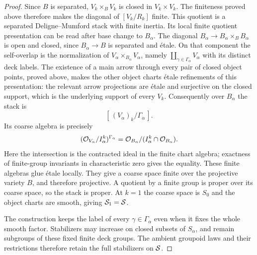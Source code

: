 \begin{proof}
Since $B$ is separated, $V_k\times_BV_k$ is closed in $V_k\times V_k$.
The finiteness proved above therefore makes the diagonal of
$[V_k/R_k]$ finite.  This quotient is a separated Deligne--Mumford
stack with finite inertia.  Its local finite quotient presentation
can be read after base change to $B_\alpha$.  The diagonal
$B_\alpha\to B_\alpha\times_BB_\alpha$ is open and closed, since
$B_\alpha\to B$ is separated and \'etale.  On that component the
self-overlap is the normalization of
$V_\alpha\times_{B_\alpha}V_\alpha$, namely
$\coprod_{\gamma\in\Gamma_\alpha}V_\alpha$ with its distinct deck
labels.  The existence of a main arrow through every pair of closed
object points, proved above, makes the other object charts \'etale
refinements of this presentation: the relevant arrow projections
are \'etale and surjective on the closed support, which is the
underlying support of every $V_k$.  Consequently over $B_\alpha$
the stack is
\[
 [\,(V_\alpha)_k/\Gamma_\alpha\,].
\]
Its coarse algebra is precisely
\[
 (\mathcal O_{V_\alpha}/I_\alpha^k)^{\Gamma_\alpha}
   =\mathcal O_{B_\alpha}/(I_\alpha^k\cap\mathcal O_{B_\alpha}).
\]
Here the intersection is the contracted ideal in the finite chart
algebra; exactness of finite-group invariants in characteristic zero
gives the equality.  These finite algebras glue \'etale locally.
They give a coarse space finite over the projective variety $B$, and
therefore projective.  A quotient by a finite group is proper over
its coarse space, so the stack is proper.  At $k=1$ the coarse space
is $S_0$ and the object charts are smooth, giving $\mathcal S_1=\mathcal S$.

The construction keeps the label of every $\gamma\in\Gamma_\alpha$
even when it fixes the whole smooth factor.  Stabilizers may increase
on closed subsets of $S_\alpha$, and remain subgroups of these fixed
finite deck groups.  The ambient groupoid laws and their restrictions
therefore retain the full stabilizers on $\mathcal S$.


\end{proof}
